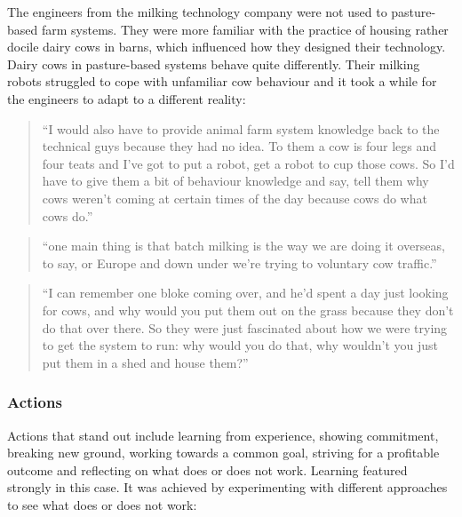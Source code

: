 The engineers from the milking technology company were not used to pasture-based farm systems. They were more familiar with the practice of housing rather docile dairy cows in barns, which influenced how they designed their technology. Dairy cows in pasture-based systems behave quite differently. Their milking robots struggled to cope with unfamiliar cow behaviour and it took a while for the engineers to adapt to a different reality:

\begin{quote}
\small
\enquote{I would also have to provide animal farm system knowledge back to the technical guys because they had no idea. To them a cow is four legs and four teats and I've got to put a robot, get a robot to cup those cows.  So I'd have to give them a bit of behaviour knowledge and say, tell them why cows weren't coming at certain times of the day because cows do what cows do.} \\
\end{quote}

\begin{quote}
\small
\enquote{one main thing is that batch milking is the way we are doing it overseas, to say, or Europe and down under we’re trying to voluntary cow traffic.} \\
\end{quote}

\begin{quote}
\small
\enquote{I can remember one bloke coming over, and he'd spent a day just looking for cows, and why would you put them out on the grass because they don't do that over there. So they were just fascinated about how we were trying to get the system to run: why would you do that, why wouldn't you just put them in a shed and house them?} \\
\end{quote}

\subsubsection{Actions}

Actions that stand out include learning from experience, showing commitment, breaking new ground, working towards a common goal, striving for a profitable outcome and reflecting on what does or does not work. Learning featured strongly in this case. It was achieved by experimenting with different approaches to see what does or does not work:


